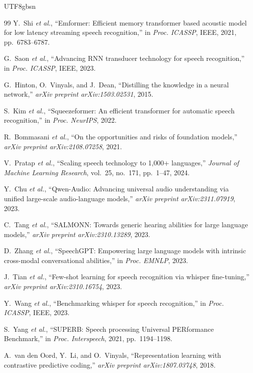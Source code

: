 \documentclass[12pt,a4paper]{article}
\newcommand{\etal}{\textit{et al.}}
\begin{document}
\begin{CJK}{UTF8}{gbsn}
\begin{thebibliography}{99}
Y.~Shi \etal,
``Emformer: Efficient memory transformer based acoustic model for low latency streaming speech recognition,''
in \textit{Proc. ICASSP}, IEEE, 2021, pp.~6783--6787.

G.~Saon \etal,
``Advancing RNN transducer technology for speech recognition,''
in \textit{Proc. ICASSP}, IEEE, 2023.

G.~Hinton, O.~Vinyals, and J.~Dean,
``Distilling the knowledge in a neural network,''
\textit{arXiv preprint arXiv:1503.02531}, 2015.

S.~Kim \etal,
``Squeezeformer: An efficient transformer for automatic speech recognition,''
in \textit{Proc. NeurIPS}, 2022.

R.~Bommasani \etal,
``On the opportunities and risks of foundation models,''
\textit{arXiv preprint arXiv:2108.07258}, 2021.

V.~Pratap \etal,
``Scaling speech technology to 1,000+ languages,''
\textit{Journal of Machine Learning Research}, vol.~25, no.~171, pp.~1--47, 2024.

Y.~Chu \etal,
``Qwen-Audio: Advancing universal audio understanding via unified large-scale audio-language models,''
\textit{arXiv preprint arXiv:2311.07919}, 2023.

C.~Tang \etal,
``SALMONN: Towards generic hearing abilities for large language models,''
\textit{arXiv preprint arXiv:2310.13289}, 2023.

D.~Zhang \etal,
``SpeechGPT: Empowering large language models with intrinsic cross-modal conversational abilities,''
in \textit{Proc. EMNLP}, 2023.

J.~Tian \etal,
``Few-shot learning for speech recognition via whisper fine-tuning,''
\textit{arXiv preprint arXiv:2310.16754}, 2023.

Y.~Wang \etal,
``Benchmarking whisper for speech recognition,''
in \textit{Proc. ICASSP}, IEEE, 2023.

S.~Yang \etal,
``SUPERB: Speech processing Universal PERformance Benchmark,''
in \textit{Proc. Interspeech}, 2021, pp.~1194--1198.

A.~van den Oord, Y.~Li, and O.~Vinyals,
``Representation learning with contrastive predictive coding,''
\textit{arXiv preprint arXiv:1807.03748}, 2018.


\end{thebibliography}
\end{CJK}
\end{document}
